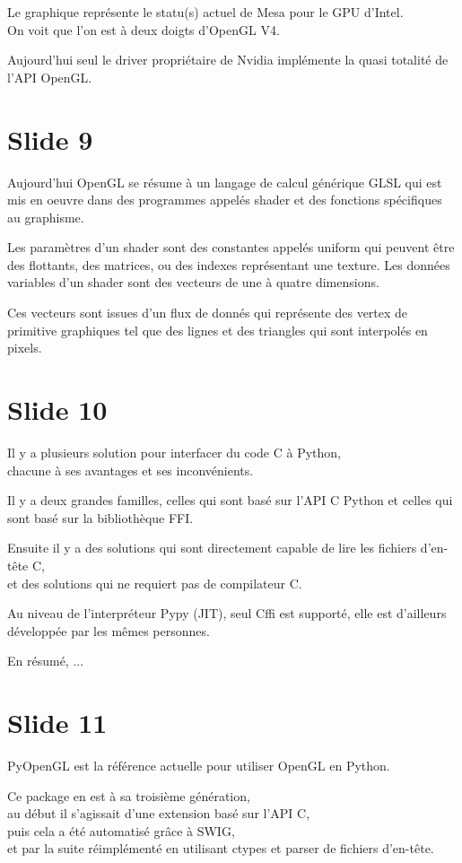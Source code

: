 \documentclass[12pt]{article}
\begin{document}
Le graphique représente le statu(s) actuel de Mesa pour le GPU d'Intel. \\
On voit que l'on est à deux doigts d'OpenGL V4.

Aujourd'hui seul le driver propriétaire de Nvidia implémente la quasi totalité de l'API OpenGL.

\section{Slide 9}

Aujourd'hui OpenGL se résume à un langage de calcul générique GLSL qui est mis en oeuvre dans des programmes
appelés shader et des fonctions spécifiques au graphisme.

Les paramètres d'un shader sont des constantes appelés uniform qui peuvent être des flottants, des
matrices, ou des indexes représentant une texture. Les données variables d'un shader sont des
vecteurs de une à quatre dimensions.

Ces vecteurs sont issues d'un flux de donnés qui représente des vertex de primitive graphiques tel
que des lignes et des triangles qui sont interpolés en pixels.  

\section{Slide 10}

Il y a plusieurs solution pour interfacer du code C à Python, \\
chacune à ses avantages et ses inconvénients.

Il y a deux grandes familles, celles qui sont basé sur l'API C Python et celles qui sont basé sur la
bibliothèque FFI.

Ensuite il y a des solutions qui sont directement capable de lire les fichiers d'en-tête C, \\
et des solutions qui ne requiert pas de compilateur C.

Au niveau de l'interpréteur Pypy (JIT), seul Cffi est supporté, elle est d'ailleurs développée par
les mêmes personnes.

En résumé, ...

\section{Slide 11}

PyOpenGL est la référence actuelle pour utiliser OpenGL en Python.

Ce package en est à sa troisième génération, \\
au début il s'agissait d'une extension basé sur l'API C, \\
puis cela a été automatisé grâce à SWIG, \\
et par la suite réimplémenté en utilisant ctypes et parser de fichiers d'en-tête.
\end{document}
